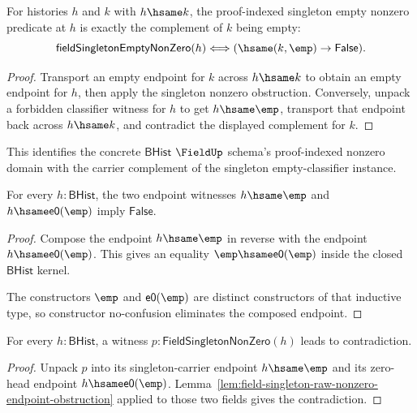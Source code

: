 \begin{theorem}
\label{thm:field-singleton-empty-nonzero-hsame-empty-complement}
For histories $h$ and $k$ with $h\hsame k$, the proof-indexed singleton empty
nonzero predicate at $h$ is exactly the complement of $k$ being empty:
$$
\mathsf{fieldSingletonEmptyNonZero}(h)
\Longleftrightarrow
(\hsame(k,\emp)\to\mathsf{False}).
$$
\end{theorem}
\begin{proof}
Transport an empty endpoint for $k$ across $h\hsame k$ to obtain an empty
endpoint for $h$, then apply the singleton nonzero obstruction. Conversely,
unpack a forbidden classifier witness for $h$ to get $h\hsame\emp$, transport
that endpoint back across $h\hsame k$, and contradict the displayed complement
for $k$.
\end{proof}

This identifies the concrete $\mathsf{BHist}$ $\FieldUp$ schema's
proof-indexed nonzero domain with the carrier complement of the singleton
empty-classifier instance.

\begin{lemma}
\label{lem:field-singleton-raw-nonzero-endpoint-obstruction}
For every $h:\mathsf{BHist}$, the two endpoint witnesses
$h\hsame\emp$ and $h\hsame\mathsf{e0}(\emp)$ imply
$\mathsf{False}$.
\end{lemma}
\begin{proof}
Compose the endpoint $h\hsame\emp$ in reverse with the endpoint
$h\hsame\mathsf{e0}(\emp)$. This gives an equality
$\emp\hsame\mathsf{e0}(\emp)$ inside the closed $\mathsf{BHist}$ kernel.

The constructors $\emp$ and $\mathsf{e0}(\emp)$ are distinct constructors of
that inductive type, so constructor no-confusion eliminates the composed
endpoint.
\end{proof}

\begin{theorem}
\label{thm:field-singleton-nonzero-absurd}
For every $h:\mathsf{BHist}$, a witness
$p:\mathsf{FieldSingletonNonZero}(h)$ leads to contradiction.
\end{theorem}
\begin{proof}
Unpack $p$ into its singleton-carrier endpoint $h\hsame\emp$ and its zero-head
endpoint $h\hsame\mathsf{e0}(\emp)$. Lemma~\ref{lem:field-singleton-raw-nonzero-endpoint-obstruction}
applied to those two fields gives the contradiction.
\end{proof}

